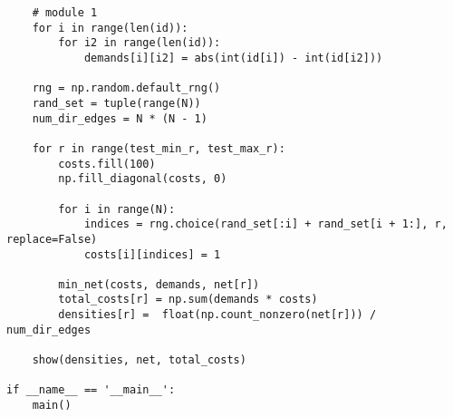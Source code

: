 \documentclass{article}
\begin{document}
\begin{verbatim}
    # module 1
    for i in range(len(id)):
        for i2 in range(len(id)):
            demands[i][i2] = abs(int(id[i]) - int(id[i2]))

    rng = np.random.default_rng()
    rand_set = tuple(range(N))
    num_dir_edges = N * (N - 1)

    for r in range(test_min_r, test_max_r):
        costs.fill(100)
        np.fill_diagonal(costs, 0)

        for i in range(N):
            indices = rng.choice(rand_set[:i] + rand_set[i + 1:], r, replace=False)
            costs[i][indices] = 1

        min_net(costs, demands, net[r])
        total_costs[r] = np.sum(demands * costs)
        densities[r] =  float(np.count_nonzero(net[r])) / num_dir_edges

    show(densities, net, total_costs)

if __name__ == '__main__':
    main()
\end{verbatim}
\end{document}
